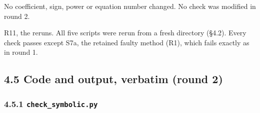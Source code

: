 \documentclass[11pt,a4paper]{article}
\begin{document}
No coefficient, sign, power or equation number changed. No check was modified in round 2.

R11, the reruns. All five scripts were rerun from a fresh directory (§4.2). Every check passes except S7a, the retained faulty method (R1), which fails exactly as in round 1.

\hypertarget{code-and-output-verbatim-round-2}{%
\subsection{4.5 Code and output, verbatim (round 2)}\label{code-and-output-verbatim-round-2}}

\hypertarget{check_symbolic.py}{%
\subsubsection{\texorpdfstring{4.5.1 \texttt{check\_symbolic.py}}{4.5.1 }}\label{check_symbolic.py}}
\end{document}
